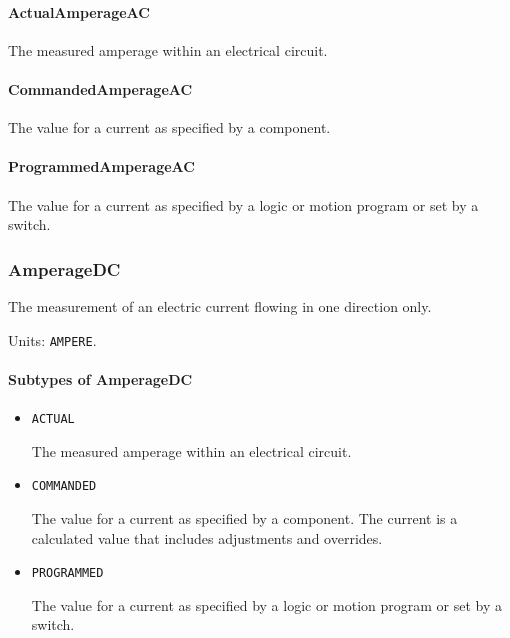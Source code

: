 \paragraph{ActualAmperageAC}\mbox{}
\label{sec:ActualAmperageAC}


The measured amperage within an electrical circuit.


\paragraph{CommandedAmperageAC}\mbox{}
\label{sec:CommandedAmperageAC}


The value for a current as specified by a component. 


\paragraph{ProgrammedAmperageAC}\mbox{}
\label{sec:ProgrammedAmperageAC}


The value for a current as specified by a logic or motion program or set by a switch.


\subsubsection{AmperageDC}
\label{sec:AmperageDC}



The measurement of an electric current flowing in one direction only.


Units: \texttt{AMPERE}.

\paragraph{Subtypes of AmperageDC}\mbox{}
\label{sec:Subtypes of AmperageDC}

\begin{itemize}

\item \texttt{ACTUAL}


The measured amperage within an electrical circuit.

\item \texttt{COMMANDED}


The value for a current as specified by a component. 
The  current is a calculated value that includes adjustments and overrides.

\item \texttt{PROGRAMMED}


The value for a current as specified by a logic or motion program or set by a switch.


\end{itemize}

